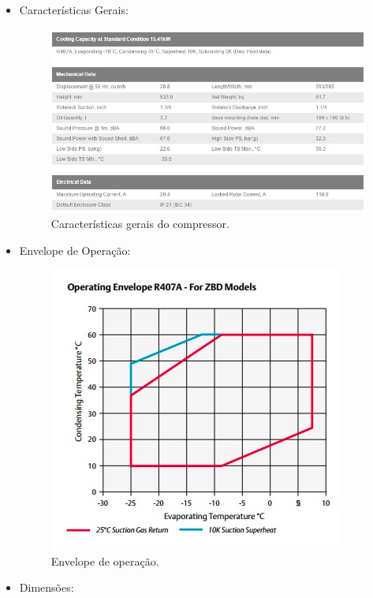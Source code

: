 	\begin{itemize}
	 \item Características Gerais:
	 
	\begin{figure}[!htbp]
	  \centering
	  \includegraphics[scale=0.7]{editaveis/figuras/tabela_cooling_capacity}
	  \caption[Capacidade de cooling]{Características gerais do compressor.\footnotemark}
	  \label{tabela_cooling_capacity}
	\end{figure}
	 \FloatBarrier
	 \item Envelope de Operação:  
	 
	\begin{figure}[!htbp] 
	  \centering
	  \includegraphics[scale=0.6]{editaveis/figuras/grafico_opereting_envelope}
	  \caption[Envelope de operação]{Envelope de operação.\footnotemark}
	  \label{grafico_opereting_envelope}
	\end{figure}	
	\FloatBarrier
	 \item Dimensões: 
	 

\end{itemize}
